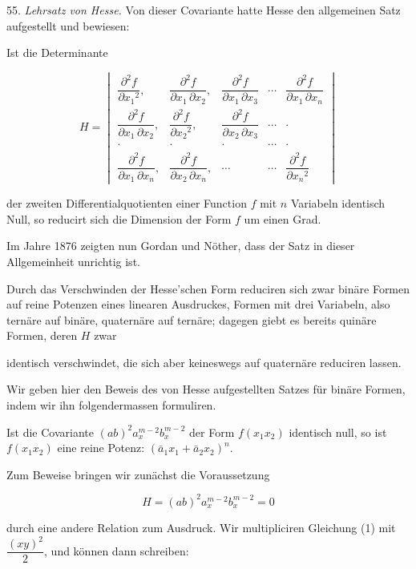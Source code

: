 \documentclass[11pt]{article}
\providecommand{\weberpage}[1]{}
\providecommand{\weq}[2]{\begin{equation}\tag{#1}#2\end{equation}}
\begin{document}
55. \textit{Lehrsatz von Hesse.} Von dieser Covariante hatte Hesse den allgemeinen Satz aufgestellt und bewiesen:

\glqq Ist die Determinante

\[
H =
\begin{vmatrix}
\dfrac{\partial^2 f}{\partial x_1{}^2}, & \dfrac{\partial^2 f}{\partial x_1\,\partial x_2}, & \dfrac{\partial^2 f}{\partial x_1\,\partial x_3} & \cdots & \dfrac{\partial^2 f}{\partial x_1\,\partial x_n} \\
\dfrac{\partial^2 f}{\partial x_1\,\partial x_2}, & \dfrac{\partial^2 f}{\partial x_2{}^2}, & \dfrac{\partial^2 f}{\partial x_2\,\partial x_3} & \cdots & \cdot \\
\cdot & \cdot & \cdot & \cdots & \cdot \\
\dfrac{\partial^2 f}{\partial x_1\,\partial x_n}, & \dfrac{\partial^2 f}{\partial x_2\,\partial x_n}, & \cdots & \cdots & \dfrac{\partial^2 f}{\partial x_n{}^2}
\end{vmatrix}
\]

der zweiten Differentialquotienten einer Function $f$ mit $n$ Variabeln identisch Null, so reducirt sich die Dimension der Form $f$ um einen Grad.\grqq{}

Im Jahre 1876 zeigten nun Gordan und Nöther, dass der Satz in dieser Allgemeinheit unrichtig ist.

Durch das Verschwinden der Hesse'schen Form reduciren sich zwar binäre Formen auf reine Potenzen eines linearen Ausdruckes, Formen mit drei Variabeln, also ternäre auf binäre, quaternäre auf ternäre; dagegen giebt es bereits quinäre Formen, deren $H$ zwar


\weberpage{59}
identisch verschwindet, die sich aber keineswegs auf quaternäre reduciren lassen.

Wir geben hier den Beweis des von Hesse aufgestellten Satzes für binäre Formen, indem wir ihn folgendermassen formuliren.

\glqq Ist die Covariante $(ab)^2 a_x^{m-2}b_x^{m-2}$ der Form $f(x_1 x_2)$ identisch null, so ist $f(x_1 x_2)$ eine reine Potenz: $(\bar a_1 x_1 + \bar a_2 x_2)^n$.\grqq{}

Zum Beweise bringen wir zunächst die Voraussetzung

\weq{1}{H = (ab)^2 a_x^{m-2}b_x^{m-2} = 0}

durch eine andere Relation zum Ausdruck. Wir multipliciren Gleichung (1) mit $\dfrac{(xy)^2}{2}$, und können dann schreiben:
\end{document}
